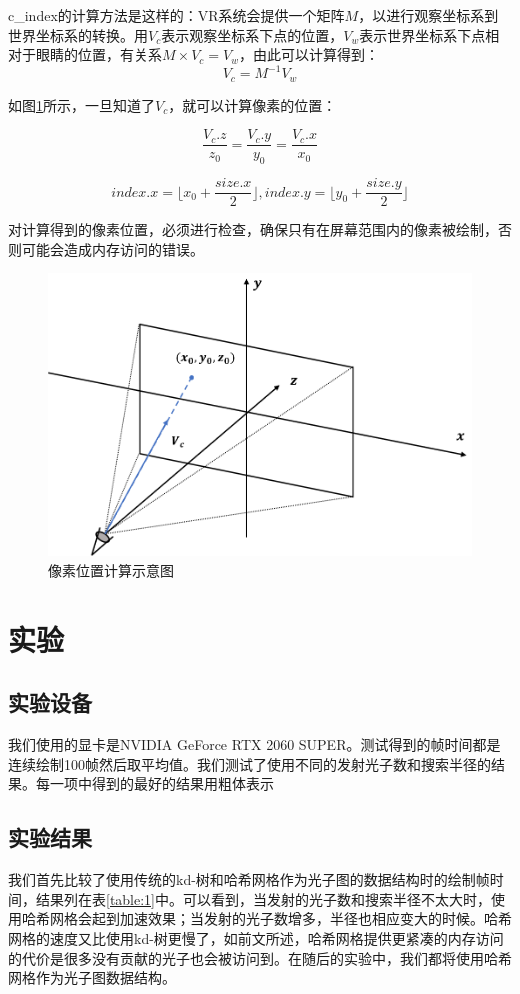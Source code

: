 \documentclass[UTF8]{ctexart}
\begin{document}
    c\_index的计算方法是这样的：VR系统会提供一个矩阵$M$，以进行观察坐标系到世界坐标系的转换。用$V_{c}$表示观察坐标系下点的位置，$V_{w}$表示世界坐标系下点相对于眼睛的位置，有关系$M\times V_{c}=V_{w}$，由此可以计算得到：
    $$V_{c}=M^{-1}V_{w}$$
    
    如图\ref{fig:4}所示，一旦知道了$V_{c}$，就可以计算像素的位置：
    
    $$\frac{V_c.z}{z_0}=\frac{V_c.y}{y_0}=\frac{V_c.x}{x_0}$$
    
    $$index.x=\lfloor x_0+\frac{size.x}{2} \rfloor,index.y=\lfloor y_0+\frac{size.y}{2} \rfloor$$
    
    对计算得到的像素位置，必须进行检查，确保只有在屏幕范围内的像素被绘制，否则可能会造成内存访问的错误。
    
    \begin{figure}[htbp]
    \centering
    \includegraphics[scale=0.6]{pic/IndexCalculation.png}
    \caption{像素位置计算示意图}
    \label{fig:4}
    \end{figure}

\section{实验}
    \subsection{实验设备}

    我们使用的显卡是NVIDIA GeForce RTX 2060 SUPER。测试得到的帧时间都是连续绘制100帧然后取平均值。我们测试了使用不同的发射光子数和搜索半径的结果。每一项中得到的最好的结果用粗体表示

    \subsection{实验结果}
    我们首先比较了使用传统的kd-树和哈希网格作为光子图的数据结构时的绘制帧时间，结果列在表\ref{table:1}中。可以看到，当发射的光子数和搜索半径不太大时，使用哈希网格会起到加速效果；当发射的光子数增多，半径也相应变大的时候。哈希网格的速度又比使用kd-树更慢了，如前文所述，哈希网格提供更紧凑的内存访问的代价是很多没有贡献的光子也会被访问到。在随后的实验中，我们都将使用哈希网格作为光子图数据结构。
    
\end{document}

